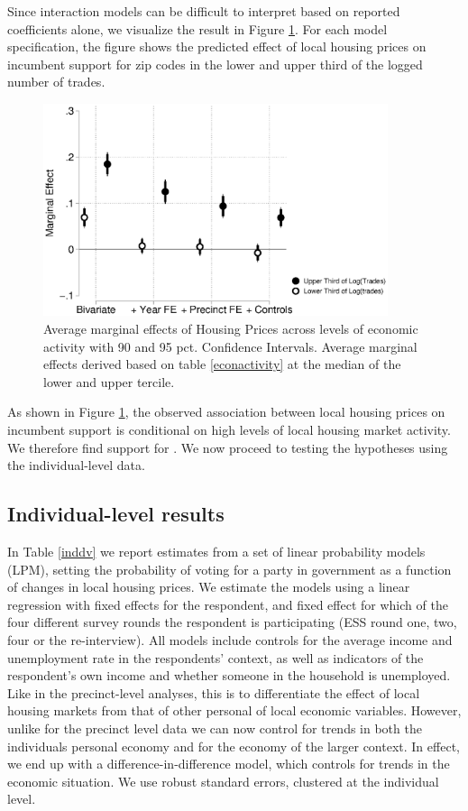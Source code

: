 \documentclass[12pt,a4paper]{article}
\begin{document}
	Since interaction models can be difficult to interpret based on reported coefficients alone, we visualize the result in Figure \ref{localactivity}. For each model specification, the figure shows the predicted effect of local housing prices on incumbent support for zip codes in the lower and upper third of the logged number of trades. 	
	\begin{figure}[htbp!]
		\includegraphics[width=0.9\textwidth]{../figures/localactivity.eps}
		\centering
		\caption{Average marginal effects of Housing Prices across levels of economic activity with 90  and 95 pct. Confidence Intervals.  Average marginal effects derived based on table \ref{econactivity} at the median of the lower and upper tercile.}\label{localactivity}
	\end{figure}
	
	As shown in Figure \ref{localactivity}, the observed association between local housing prices on incumbent support is conditional on high levels of local housing market activity. We therefore find support for \htwo. We now proceed to testing the hypotheses using the individual-level data.
	
	\subsection{Individual-level results}
	
	In Table \ref{inddv} we report estimates from a set of linear probability models (LPM), setting the probability of voting for a party in government as a function of changes in local housing prices. We estimate the models using a linear regression with fixed effects for the respondent, and fixed effect for which of the four different survey rounds the respondent is participating (ESS round one, two, four or the re-interview). All models include controls for the average income and unemployment rate in the respondents’ context, as well as indicators of the respondent's own income and whether someone in the household is unemployed. Like in the precinct-level analyses, this is to differentiate the effect of local housing markets from that of other personal of local economic variables. However, unlike for the precinct level data we can now control for trends in both the individuals personal economy and for the economy of the larger context. In effect, we end up with a difference-in-difference model, which controls for trends in the economic situation. We use robust standard errors, clustered at the individual level.
	
\end{document}
